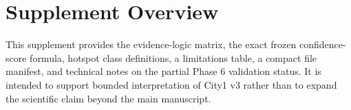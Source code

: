 \section*{Supplement Overview}

This supplement provides the evidence-logic matrix, the exact frozen confidence-score formula, hotspot class definitions, a limitations table, a compact file manifest, and technical notes on the partial Phase 6 validation status. It is intended to support bounded interpretation of City1 v3 rather than to expand the scientific claim beyond the main manuscript.

